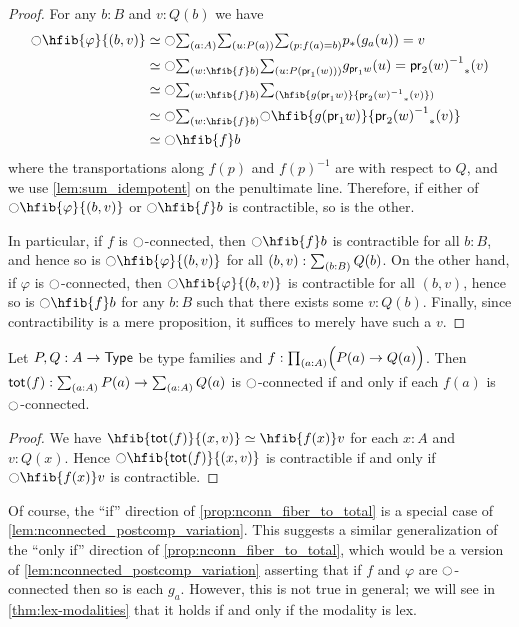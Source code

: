 \begin{proof}
For any $b:B$ and $v:Q(b)$ we have
{\allowdisplaybreaks
\begin{align*}
\modal{\hfib{\varphi}{\pairr{b,v}}} & \eqvsym \modal{\sm{a:A}{u:P(a)}{p:f(a)= b} \trans{p}{g_a(u)}= v}\\
& \eqvsym \modal{\sm{w:\hfib{f}b}{u:P(\proj1(w))} g_{\proj 1 w}(u)= \trans{\opp{\proj2(w)}}{v}}\\
& \eqvsym \modal{\sm{w:\hfib{f}b} \hfib{g(\proj1 w)}{\trans{\opp{\proj 2(w)}}{v}}}\\
& \eqvsym \modal{\sm{w:\hfib{f}b} \modal{\hfib{g(\proj1 w)}{\trans{\opp{\proj 2(w)}}{v}}}}\\
& \eqvsym \modal{\hfib{f}b}
\end{align*}}%
where the transportations along $f(p)$ and $f(p)^{-1}$ are with respect to $Q$, and we use \cref{lem:sum_idempotent} on the penultimate line.
Therefore, if either of $\modal{\hfib{\varphi}{\pairr{b,v}}}$ or $\modal{\hfib{f}b}$ is contractible, so is the other.

In particular, if $f$ is ${\ocircle}$-connected, then $\modal{\hfib{f}b}$ is contractible for all $b:B$, and hence so is $\modal{\hfib{\varphi}{\pairr{b,v}}}$ for all $(b,v):\sm{b:B} Q(b)$.
On the other hand, if $\varphi$ is ${\ocircle}$-connected, then $\modal{\hfib{\varphi}{\pairr{b,v}}}$ is contractible for all $(b,v)$, hence so is $\modal{\hfib{f}b}$ for any $b:B$ such that there exists some $v:Q(b)$.
Finally, since contractibility is a mere proposition, it suffices to merely have such a $v$.
\end{proof}

\begin{lem}\label{prop:nconn_fiber_to_total}
Let $P,Q:A\to\mathsf{Type}$ be type families and $f:\prd{a:A} \Parens{P(a)\to Q(a)}$.
Then $\total f: \sm{a:A}P(a) \to \sm{a:A} Q(a)$ is ${\ocircle}$-connected if and only if each $f(a)$ is ${\ocircle}$-connected.
\end{lem}
\begin{proof}
We have
$\hfib{\total f}{\pairr{x,v}}\eqvsym\hfib{f(x)}v$
for each $x:A$ and $v:Q(x)$. Hence $\modal{\hfib{\total f}{\pairr{x,v}}}$ is contractible if and only if
$\modal{\hfib{f(x)}v}$ is contractible.
\end{proof}

Of course, the ``if'' direction of \cref{prop:nconn_fiber_to_total} is a special case of \cref{lem:nconnected_postcomp_variation}.
This suggests a similar generalization of the ``only if'' direction of \cref{prop:nconn_fiber_to_total}, which would be a version of \cref{lem:nconnected_postcomp_variation} asserting that if $f$ and $\varphi$ are ${\ocircle}$-connected then so is each $g_a$.
However, this is not true in general; we will see in \cref{thm:lex-modalities} that it holds if and only if the modality is lex.

